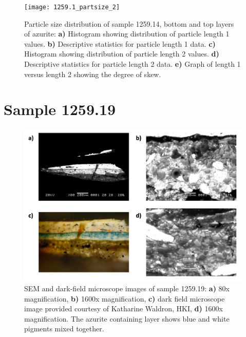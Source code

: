 \begin{figure}[H]
\centering
  \texttt{[image: 1259.1\_partsize\_2]}
\caption[Particle size distribution, sample 1259.14 bottom and top layers.]{Particle size distribution of sample 1259.14, bottom and top layers of azurite: \textbf{a)} Histogram showing distribution of particle length 1 values. \textbf{b)} Descriptive statistics for particle length 1 data. \textbf{c)} Histogram showing distribution of particle length 2 values. \textbf{d)} Descriptive statistics for particle length 2 data. \textbf{e)} Graph of length 1 versus length 2 showing the degree of skew.}
\label{fig:1259.1_partsize_2}
\end{figure}


\section{Sample 1259.19}

\begin{figure}[H]
  \centering
  \includegraphics[width=0.8\linewidth]{1259.19_imgs}
\caption[SEM and dark-field microscope images of sample 1259.19.]{SEM and dark-field microscope images of sample 1259.19: \textbf{a)} 80x magnification, \textbf{b)} 1600x magnification, \textbf{c)} dark field microscope image provided courtesy of Katharine Waldron, HKI, \textbf{d)} 1600x magnification. The azurite containing layer shows blue and white pigments mixed together.}
\label{fig:1259.19_imgs}
\end{figure}


